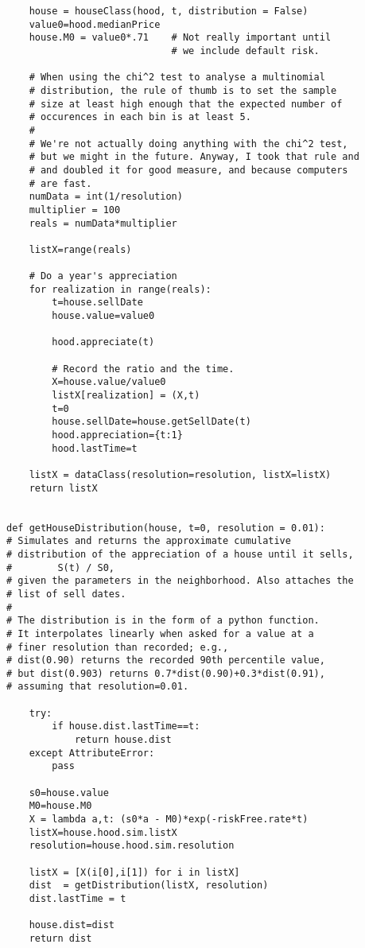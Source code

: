 \begin{lstlisting}
    house = houseClass(hood, t, distribution = False)
    value0=hood.medianPrice
    house.M0 = value0*.71    # Not really important until
                             # we include default risk.

    # When using the chi^2 test to analyse a multinomial
    # distribution, the rule of thumb is to set the sample
    # size at least high enough that the expected number of
    # occurences in each bin is at least 5.
    #
    # We're not actually doing anything with the chi^2 test,
    # but we might in the future. Anyway, I took that rule and
    # and doubled it for good measure, and because computers
    # are fast.
    numData = int(1/resolution)
    multiplier = 100
    reals = numData*multiplier

    listX=range(reals)
    
    # Do a year's appreciation
    for realization in range(reals):
        t=house.sellDate
        house.value=value0

        hood.appreciate(t)

        # Record the ratio and the time.
        X=house.value/value0
        listX[realization] = (X,t)
        t=0
        house.sellDate=house.getSellDate(t)
        hood.appreciation={t:1}
        hood.lastTime=t

    listX = dataClass(resolution=resolution, listX=listX)
    return listX


def getHouseDistribution(house, t=0, resolution = 0.01):
# Simulates and returns the approximate cumulative
# distribution of the appreciation of a house until it sells,
#        S(t) / S0,
# given the parameters in the neighborhood. Also attaches the
# list of sell dates.
#
# The distribution is in the form of a python function.
# It interpolates linearly when asked for a value at a
# finer resolution than recorded; e.g.,
# dist(0.90) returns the recorded 90th percentile value,
# but dist(0.903) returns 0.7*dist(0.90)+0.3*dist(0.91),
# assuming that resolution=0.01.

    try:
        if house.dist.lastTime==t:
            return house.dist
    except AttributeError:
        pass

    s0=house.value
    M0=house.M0
    X = lambda a,t: (s0*a - M0)*exp(-riskFree.rate*t)
    listX=house.hood.sim.listX
    resolution=house.hood.sim.resolution
    
    listX = [X(i[0],i[1]) for i in listX]
    dist  = getDistribution(listX, resolution)
    dist.lastTime = t

    house.dist=dist
    return dist



\end{lstlisting}
